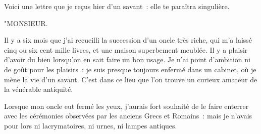 \documentclass[french,twoside]{book} %
\begin{document}
\noindent Voici une lettre que je reçus hier d’un savant : elle te paraîtra singulière.\par
"MONSIEUR.\par
Il y a six mois que j’ai recueilli la succession d’un oncle très riche, qui m’a laissé cinq ou six cent mille livres, et une maison superbement meublée. Il y a plaisir d’avoir du bien lorsqu’on en sait faire un bon usage. Je n’ai point d’ambition ni de goût pour les plaisirs : je suis presque toujours enfermé dans un cabinet, où je mène la vie d’un savant. C’est dans ce lieu que l’on trouve un curieux amateur de la vénérable antiquité.\par
Lorsque mon oncle eut fermé les yeux, j’aurais fort souhaité de le faire enterrer avec les cérémonies observées par les anciens Grecs et Romains : mais je n’avais pour lors ni lacrymatoires, ni urnes, ni lampes antiques.\par
\end{document}
